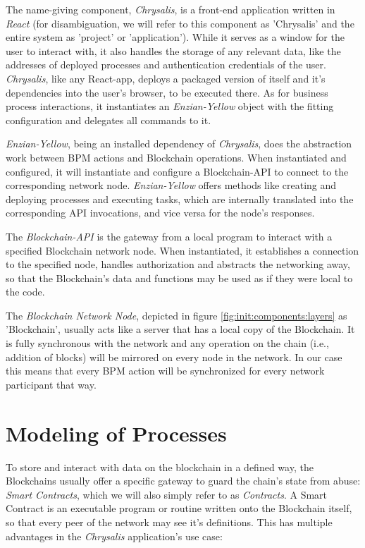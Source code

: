 The name-giving component, \emph{Chrysalis}, is a front-end application written in \emph{React} (for disambiguation, we will refer to this component as 'Chrysalis' and the entire system as 'project' or 'application'). While it serves as a window for the user to interact with, it also handles the storage of any relevant data, like the addresses of deployed processes and authentication credentials of the user. \emph{Chrysalis}, like any React-app, deploys a packaged version of itself and it's dependencies into the user's browser, to be executed there. As for business process interactions, it instantiates an \emph{Enzian-Yellow} object with the fitting configuration and delegates all commands to it.

\emph{Enzian-Yellow}, being an installed dependency of \emph{Chrysalis}, does the abstraction work between BPM actions and Blockchain operations. When instantiated and configured, it will instantiate and configure a Blockchain-API to connect to the corresponding network node. \emph{Enzian-Yellow} offers methods like creating and deploying processes and executing tasks, which are internally translated into the corresponding API invocations, and vice versa for the node's responses.

The \emph{Blockchain-API} is the gateway from a local program to interact with a specified Blockchain network node. When instantiated, it establishes a connection to the specified node, handles authorization and abstracts the networking away, so that the Blockchain's data and functions may be used as if they were local to the code.

The \emph{Blockchain Network Node}, depicted in figure \ref{fig:init:components:layers} as 'Blockchain', usually acts like a server that has a local copy of the Blockchain. It is fully synchronous with the network and any operation on the chain (i.e., addition of blocks) will be mirrored on every node in the network. In our case this means that every BPM action will be synchronized for every network participant that way.

\section{Modeling of Processes}
\label{sec:init:model}

To store and interact with data on the blockchain in a defined way, the Blockchains usually offer a specific gateway to guard the chain's state from abuse: \emph{Smart Contracts}, which we will also simply refer to as \emph{Contracts}. A Smart Contract is an executable program or routine written onto the Blockchain itself, so that every peer of the network may see it's definitions. This has multiple advantages in the \emph{Chrysalis} application's use case:

